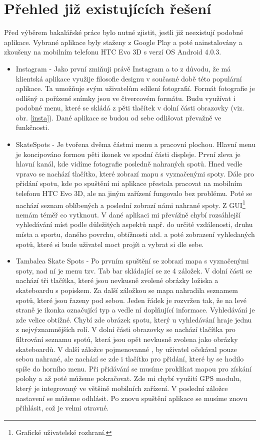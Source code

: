 \documentclass[12pt]{article}
\begin{document}
\section{Přehled již existujících řešení}
Před výběrem bakalářské práce bylo nutné zjistit, jestli již
neexistují podobné aplikace. Vybrané aplikace byly staženy z Google Play a poté nainstalovány a zkoušeny na mobilním telefonu HTC Evo 3D s verzí OS Android 4.0.3.
\begin{itemize}
\item Instagram - Jako první zmiňuji právě Instagram a to z důvodu, že má klientská aplikace využije filosofie designu v současné době této populární aplikace. Ta umožňuje svým uživatelům sdílení fotografií. Formát fotografie je odlišný a pořízené snímky jsou ve čtvercovém formátu. Budu využívat i podobné menu, které se  skládá z pěti tlačítek v dolní části obrazovky (viz. obr. \ref{insta}). Dané aplikace se budou od sebe odlišovat převažně ve funkčnosti.

\item SkateSpots - Je tvořena dvěma částmi menu a pracovní plochou. Hlavní menu je koncipováno formou pěti ikonek ve spodní části displeje. První zleva je hlavní kanál, kde vidíme fotografie posledně nahraných spotů. Hned vedle vpravo se nachází tlačítko, které zobrazí mapu s vyznačenými spoty. Dále pro přidání spotu, kde po spuštění mi aplikace přestala pracovat na mobilním telefonu HTC Evo 3D, ale na jiným zařízení fungovalo bez problému. Poté se nachází seznam oblíbených a poslední zobrazí námi nahrané spoty. Z GUI\footnote[4]{Grafické uživatelské rozhraní.} nemám téměř co vytknout. V dané aplikaci mi převážně chybí rozsáhlejší vyhledávání míst podle důležitých aspektů např. do určité vzdálenosti, druhu místa a sportu, daného povrchu, obtížnosti atd. a poté zobrazení vyhledaných spotů, které si bude uživatel moct projít a vybrat si dle sebe.

\item Tambalea Skate Spots - Po prvním spuštění se zobrazí mapa s vyznačenými spoty, nad ní je menu tzv. Tab bar skládající se ze 4 záložek. V dolní části se nachází tři tlačítka, které jsou nevkusně zvolené obrázky ložiska a skateboardu s popiskem. Za další záložkou se mapa nahradila seznamem spotů, které jsou řazeny pod sebou. Jeden řádek je rozvržen tak, že na levé straně je ikonka označující typ a vedle ní doplňující informace. Vyhledávání je zde velice obtížné. Chybí zde obrázek spotu, který u vyhledávání hraje jednu z nejvýznamnějších rolí. V dolní části obrazovky se nachází tlačítka pro filtrování seznamu spotů, která jsou opět nevkusně zvolena jako obrázky skateboardů. V další záložce pojmenovanné , by uživatel očekával pouze sebou nahrané, ale nachází se zde i tlačítko pro přidání, které by se hodilo spíše do horního menu. Při přidávání se musíme proklikat mapou pro získání polohy a až poté můžeme pokračovat. Zde mi chybí využití GPS modulu, který je integrovaný ve většině mobilních zařízení. V poslední záložce nastavení se můžeme odhlásit. Po znovu spuštění aplikace se musíme znovu přihlásit, což je velmi otravné.
\end{itemize}
\end{document}
